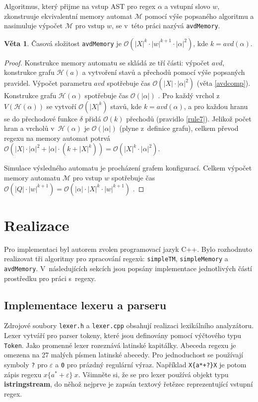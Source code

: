 \documentclass[thesis=B,czech]{FITthesis}[2019/12/23]
\theoremstyle{definition}
\newtheorem{theorem}{Věta}[chapter]
\begin{document}
	Algoritmus, který přijme na vstup AST pro regex $\alpha$ a vstupní slovo $w$, zkonstruuje ekvivalentní memory automat $\mathcal{M}$ pomocí výše popsaného algoritmu a nasimuluje výpočet $\mathcal{M}$ pro vstup $w$, se v~této práci nazývá \texttt{avdMemory}.
	\begin{theorem}
		Časová složitost \texttt{avdMemory} je $\mathcal{O}(|X|^k\cdot|w|^{k+1}\cdot|\alpha|^2)$, kde $k = avd(\alpha)$.
	\end{theorem}
	\begin{proof}
		Konstrukce memory automatu se skládá ze tří části: výpočet $avd$, konstrukce grafu $\mathcal{H}(a)$ a vytvoření stavů a přechodů pomocí výše popsaných pravidel. Výpočet parametru $avd$ spotřebuje čas $\mathcal{O}(|X|\cdot|\alpha|^2)$ (věta \ref{avdcomp}). Konstrukce grafu $\mathcal{H}(\alpha)$ spotřebuje čas $\mathcal{O}(|\alpha|)$ \cite[lemma~3]{schmidref}. Pro každý vrchol z~$V(\mathcal{H}(\alpha))$ se vytvoří $\mathcal{O}(|X|^k)$ stavů, kde $k = avd(\alpha)$, a pro každou hranu se do přechodové funkce $\delta$ přidá $\mathcal{O}(k)$ přechodů (pravidlo \ref{rule7}). Jelikož počet hran a vrcholů v~$\mathcal{H}(\alpha)$ je $\mathcal{O}(|\alpha|)$ (plyne z~definice grafu), celkem převod regexu na memory automat potrvá $\mathcal{O}(|X|\cdot|\alpha|^2 + |\alpha|\cdot(k+|X|^k)) = \mathcal{O}(|X|^k\cdot|\alpha|^2)$.
	
	Simulace výsledného automatu je procházení grafem konfigurací. Celkem výpočet memory automatu $\mathcal{M}$ pro vstup $w$ spotřebuje čas ${\mathcal{O}(|Q|\cdot|w|^{k+1})} = {\mathcal{O}(|\alpha|\cdot|X|^k\cdot|w|^{k+1})}$ \cite[lemma 3]{schmidref}.
	\end{proof}

	
\chapter{Realizace}
Pro implementaci byl autorem zvolen programovací jazyk C++. Bylo rozhodnuto realizovat tři algoritmy pro zpracování regexů: \texttt{simpleTM}, \texttt{simpleMemory} a \texttt{avdMemory}. V~následujících sekcích jsou popsány implementace jednotlivých částí prostředku pro práci s~regexy.

\section{Implementace lexeru a parseru}
Zdrojové soubory \texttt{lexer.h} a \texttt{lexer.cpp} obsahují realizaci lexikálního analyzátoru. Lexer vytváří pro parser tokeny, které jsou definovány pomocí výčtového typu \texttt{Token}. Jako promenné lexer rozeznává latinské kapitálky. Abeceda regexu je omezena na 27 malých písmen latinské abecedy. Pro jednoduchost se používají symboly \verb|?| pro $\varepsilon$ a \verb|0| pro prázdný regulární výraz. Například \verb|X{a*+?}X| je potom zápis regexu $x\{a^\ast+\varepsilon\} \ x$.
Všimněte si, že se pro lexer používá objekt typu \textbf{istringstream}, do něhož nejprve je zapsán textový řetězec reprezentující vstupní regex.
\end{document}
